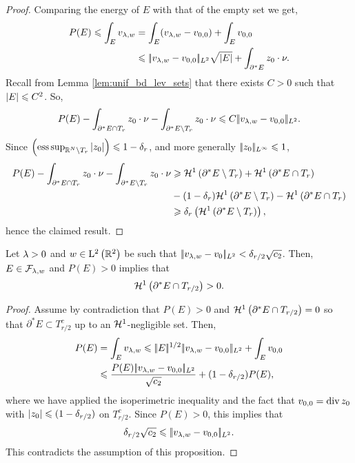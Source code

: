 \begin{proof}
Comparing the energy of $E$ with that of the empty set we get,
\begin{align*}
  P(E)\leqslant \int_{E}v_{\lambda,w} &= \int_{E}(v_{\lambda,w}-v_{0,0}) + \int_{E}v_{0,0}
  \\
                                 &\leqslant |\!| v_{\lambda,w}-v_{0,0} |\!|_{L^2}\sqrt{\left| E \right|} + \int_{\partial^* E} z_0\cdot \nu                               .
\end{align*}
Recall from  Lemma \ref{lem:unif_bd_lev_sets} that  there exists $C>0$ such that $\left| E \right|\leqslant C^2$. So, $$ P(E)- \int_{\partial^* E\cap T_r}z_0\cdot \nu - \int_{\partial^* E\setminus T_r}z_0\cdot \nu \leqslant C |\!| v_{\lambda,w}-v_{0,0} |\!|_{L^2}.$$
Since $\left(\operatorname{ess} \sup_{\mathbb{R}^N\setminus T_r}\left| z_0 \right|\right)\leqslant 1-\delta_r$, and more generally $|\!| z_0 |\!|_{L^\infty}\leqslant 1$, 
\begin{align*}
  P(E)- \int_{\partial^* E\cap T_r}z_0\cdot \nu - \int_{\partial^* E\setminus T_r}z_0\cdot \nu  &\geqslant \mathcal{H}^{1}\left({\partial^*E\setminus T_r}\right)+\mathcal{H}^{1}\left({\partial^*E\cap T_r}\right)\\
                                                                                                            &- (1-\delta_r)\mathcal{H}^{1}\left({\partial^*E\setminus T_r}\right) - \mathcal{H}^{1}\left({\partial^*E\cap T_r}\right)\\
                                                                                                            &\geqslant  \delta_r \left(\mathcal{H}^{1}\left({\partial^*E\setminus T_r}\right)\right),
\end{align*}
hence the claimed result.

\end{proof}



\begin{prop}\label{prop:entiretubecomplement}
Let $\lambda>0$ and $w\in \mathrm{L}^2\left(\mathbb{R}^2\right)$ be such that $|\!| v_{\lambda,w}-v_0 |\!|_{L^2} <\delta_{r/2}\sqrt{c_2}$. Then, $E\in \mathcal{F}_{\lambda,w}$ and $P(E)>0$ implies that
  \begin{equation*}
    \mathcal{H}^{1}\left({\partial^* E \cap T_{r/2}}\right)>0.
  \end{equation*}
\end{prop}
\begin{proof}
Assume by contradiction that $P(E)>0$ and $\mathcal{H}^{1}\left({\partial^* E\cap T_{r/2}}\right)=0$ so that $\partial^* E \subset T_{r/2}^c$ up to an $\mathcal{H}^1$-negligible set. Then,
\begin{align*}
P(E) &= \int_E v_{\lambda,w} \leqslant |\!| E |\!|^{1/2} |\!| v_{\lambda,w} - v_{0,0} |\!|_{L^2} + \int_E v_{0,0}\\
&\leqslant \frac{P(E) |\!| v_{\lambda,w} - v_{0,0} |\!|_{L^2} }{\sqrt{c_2}}+ (1-\delta_{r/2}) P(E),
\end{align*}
where we have applied the isoperimetric inequality and the fact that $v_{0,0} = \operatorname{div} z_0$ with $\left| z_0 \right|\leqslant (1-\delta_{r/2})$ on $T_{r/2}^c$. Since $P(E)>0$, this implies that
$$
\delta_{r/2}\sqrt{c_2} \leqslant |\!| v_{\lambda,w} - v_{0,0} |\!|_{L^2}.$$
This contradicts the assumption of this proposition.
\end{proof}






